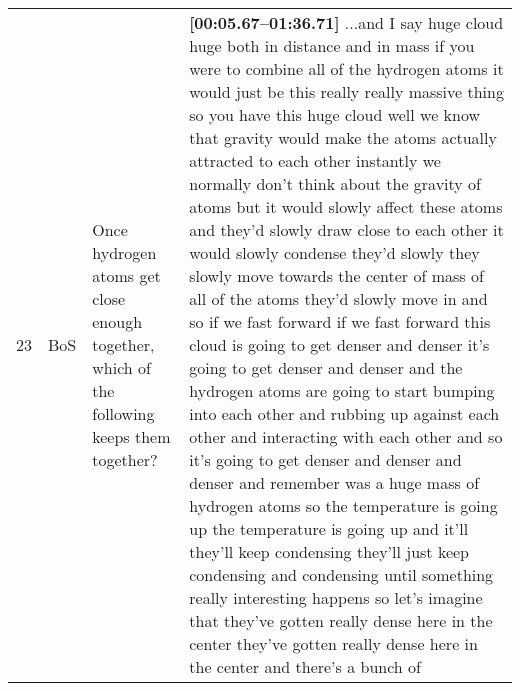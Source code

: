 \documentclass[10pt]{article}
\begin{document}
\begin{tiny}
\begin{longtable}{|r|p{0.375in}|p{1.275in}|p{3.5in}|}
23 &          BoS &                                                                                                                                                                                       Once hydrogen atoms get close enough together, which of the following keeps them together? &                                                                                                                                                                                                                                                                                                                                                                                                                                                                                                                                                                                                                                                                                                                                                                                                                                                                                                                                                                                                                                                                                                                                                                                                                                                                                                                                                                                                                                                                                                                                                                                                                                                                                                                                                                                                \textbf{[00:05.67--01:36.71]} ...and I say huge cloud huge both in distance and in mass if you were to combine all of the hydrogen atoms it would just be this really really massive thing so you have this huge cloud well we know that gravity would make the atoms actually attracted to each other instantly we normally don't think about the gravity of atoms but it would slowly affect these atoms and they'd slowly draw close to each other it would slowly condense they'd slowly they slowly move towards the center of mass of all of the atoms they'd slowly move in and so if we fast forward if we fast forward this cloud is going to get denser and denser it's going to get denser and denser and the hydrogen atoms are going to start bumping into each other and rubbing up against each other and interacting with each other and so it's going to get denser and denser and denser and remember was a huge mass of hydrogen atoms so the temperature is going up the temperature is going up and it'll they'll keep condensing they'll just keep condensing and condensing until something really interesting happens so let's imagine that they've gotten really dense here in the center they've gotten really dense here in the center and there's a bunch of 
\end{longtable}
\end{tiny}
\end{document}
